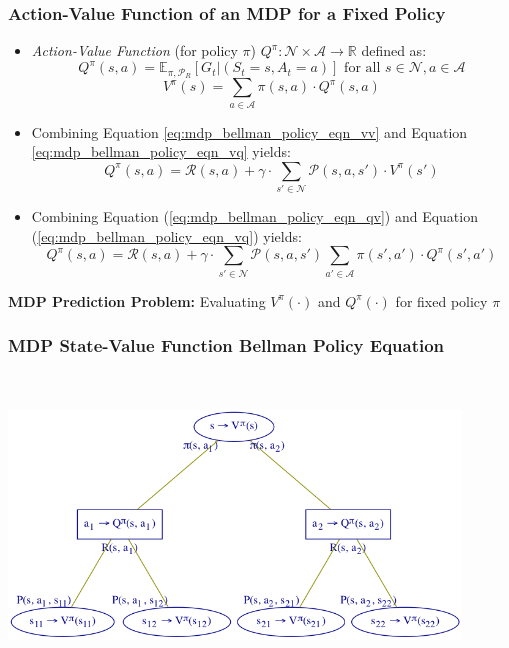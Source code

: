 \documentclass[handout]{beamer}
\begin{document}
\begin{frame}
\frametitle{Action-Value Function of an MDP for a Fixed Policy}
\pause
\begin{itemize}[<+->]
\item {\em Action-Value Function} (for policy $\pi$) $Q^{\pi}: \mathcal{N} \times \mathcal{A} \rightarrow \mathbb{R}$ defined as:
$$Q^{\pi}(s, a) = \mathbb{E}_{\pi, \mathcal{P}_R}[G_t|(S_t=s, A_t=a)] \text{ for all } s \in \mathcal{N}, a\in \mathcal{A}$$
\begin{equation}
V^{\pi}(s) = \sum_{a\in\mathcal{A}} \pi(s, a) \cdot Q^{\pi}(s, a)
\label{eq:mdp_bellman_policy_eqn_vq}
\end{equation}
\item Combining Equation \eqref{eq:mdp_bellman_policy_eqn_vv} and Equation \eqref{eq:mdp_bellman_policy_eqn_vq} yields:
\begin{equation}
Q^{\pi}(s, a) = \mathcal{R}(s,a) + \gamma \cdot \sum_{s'\in \mathcal{N}} \mathcal{P}(s,a,s') \cdot V^{\pi}(s')
\label{eq:mdp_bellman_policy_eqn_qv}
\end{equation}
\item Combining Equation (\ref{eq:mdp_bellman_policy_eqn_qv}) and Equation (\ref{eq:mdp_bellman_policy_eqn_vq}) yields:
\begin{equation}
Q^{\pi}(s, a) = \mathcal{R}(s,a) + \gamma \cdot \sum_{s'\in \mathcal{N}} \mathcal{P}(s,a,s') \sum_{a'\in \mathcal{A}} \pi(s', a') \cdot Q^{\pi}(s', a')
\label{eq:mdp_bellman_policy_eqn_qq}
\end{equation}
\end{itemize}
\pause
{\bf MDP Prediction Problem:} Evaluating $V^{\pi}(\cdot)$ and $Q^{\pi}(\cdot)$ for fixed policy $\pi$
\end{frame}

\begin{frame}
\frametitle{MDP State-Value Function Bellman Policy Equation}
\includegraphics[width=12cm, height=8cm]{mdp_bellman_policy_tree_vv.png}
\end{frame}
\end{document}
